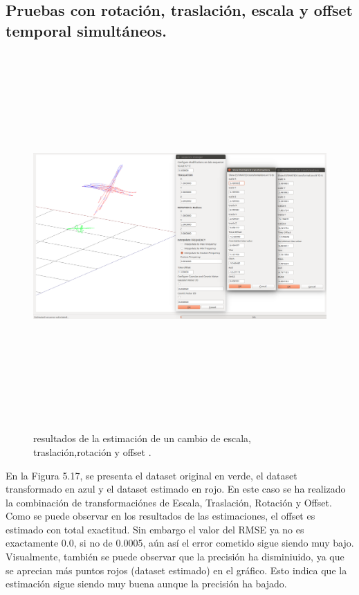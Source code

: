 \subsection{Pruebas con rotación, traslación, escala y offset temporal simultáneos.}
\begin{figure}[H]
\begin{center}
\label{fig:opciones de View}\includegraphics[height=14.0cm,width=18.0cm]{img/cap6/Escala_Trasla_Rota_Offset_abba.png}
\hspace{0.5cm}

\end{center}

\caption{ resultados de la estimación de un cambio de escala, traslación,rotación y offset .}
\end{figure}

En la Figura 5.17, se presenta el dataset original en verde, el dataset transformado en azul y el dataset estimado en rojo.
En este caso se ha realizado la combinación de transformaciónes de Escala, Traslación, Rotación y Offset.
Como se puede observar en los resultados de las estimaciones, el offset es estimado con total exactitud. Sin embargo el valor del RMSE ya no es exactamente 0.0, si no de 0.0005, aún así el error cometido sigue siendo muy bajo.
Visualmente, también se puede observar que la precisión ha disminiuido, ya que se aprecian más puntos rojos (dataset estimado) en el gráfico. Esto indica que la estimación sigue siendo muy buena aunque la precisión ha bajado.



